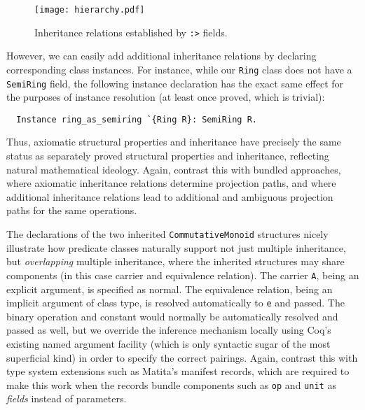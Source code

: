 \documentclass[a4paper,10pt,runningheads]{llncs}
\begin{document}
\begin{figure}
\label{inheritancediagram}
\centering
\texttt{[image: hierarchy.pdf]}
\caption{Inheritance relations established by \lstinline|:>| fields.}
\end{figure}

However, we can easily add additional inheritance relations by declaring corresponding class instances. For instance, while our \lstinline|Ring| class does not have a \lstinline|SemiRing| field, the following instance declaration has the exact same effect for the purposes of instance resolution (at least once proved, which is trivial):
\begin{lstlisting}
  Instance ring_as_semiring `{Ring R}: SemiRing R.
\end{lstlisting}

Thus, axiomatic structural properties and inheritance have precisely the same status as separately proved structural properties and inheritance, reflecting natural mathematical ideology. Again, contrast this with bundled approaches, where axiomatic inheritance relations determine projection paths, and where additional inheritance relations lead to additional and ambiguous projection paths for the same operations.


The declarations of the two inherited \lstinline|CommutativeMonoid| structures nicely illustrate how predicate classes naturally support not just multiple inheritance, but \emph{overlapping} multiple inheritance, where the inherited structures may share components (in this case carrier and equivalence relation). The carrier \lstinline|A|, being an explicit argument, is specified as normal. The equivalence relation, being an implicit argument of class type, is resolved automatically to \lstinline|e| and passed. The binary operation and constant would normally be automatically resolved and passed as well, but we override the inference mechanism locally using Coq's existing named argument facility (which is only syntactic sugar of the most superficial kind) in order to specify the correct pairings. 
Again, contrast this with type system extensions such as Matita's manifest records, which are required to make this work when the records bundle components such as \lstinline|op| and \lstinline{unit} as \emph{fields} instead of parameters.
\end{document}
